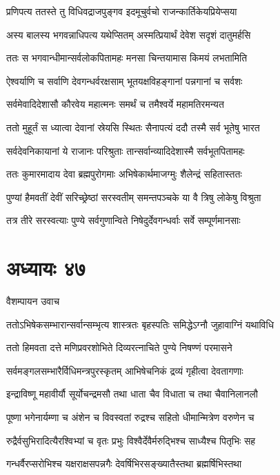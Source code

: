 \twolineshloka
{प्रणिपत्य ततस्ते तु विधिवद्राजपुङ्गव}
{इदमूचुर्वचो राजन्कार्तिकेयप्रियेप्सया}


\twolineshloka
{अस्य बालस्य भगवन्नाधिपत्य यथेप्सितम्}
{अस्मत्प्रियार्थं देवेश सदृशं दातुमर्हसि}


\twolineshloka
{ततः स भगवान्धीमान्सर्वलोकपितामहः}
{मनसा चिन्तयामास किमयं लभतामिति}


\twolineshloka
{ऐश्वर्याणि च सर्वाणि देवगन्धर्वरक्षसाम्}
{भूतयक्षविहङ्गानां पन्नगानां च सर्वशः}


\twolineshloka
{सर्वमेवादिदेशासौ कौरवेय महात्मनः}
{समर्थं च तमैश्वर्ये महामतिरमन्यत}


\twolineshloka
{ततो मुहूर्तं स ध्यात्वा देवानां स्रेयसि स्थितः}
{सैनापत्यं ददौ तस्मै सर्व भूतेषु भारत}


\twolineshloka
{सर्वदेवनिकायानां ये राजानः परिश्रुताः}
{तान्सर्वान्व्यादिदेशास्मै सर्वभूतपितामहः}


\twolineshloka
{ततः कुमारमादाय देवा ब्रह्मपुरोगमाः}
{अभिषेकार्थमाजग्मुः शैलेन्द्रं सहितास्ततः}


\twolineshloka
{पुण्यां हैमवतीं देवीं सरिच्छ्रेष्ठां सरस्वतीम्}
{समन्तपञ्चके या वै त्रिषु लोकेषु विश्रुता}


\twolineshloka
{तत्र तीरे सरस्वत्याः पुण्ये सर्वगुणान्विते}
{निषेदुर्देवगन्धर्वाः सर्वे सम्पूर्णमानसाः}


\chapter{अध्यायः ४७}
\twolineshloka
{वैशम्पायन उवाच}
{}


\twolineshloka
{ततोऽभिषेकसम्भारान्सर्वान्सम्भृत्य शास्त्रतः}
{बृहस्पतिः समिद्धेऽग्नौ जुहावाग्निं यथाविधि}


\twolineshloka
{ततो हिमवता दत्ते मणिप्रवरशोभिते}
{दिव्यरत्नाचिते पुण्ये निषण्णं परमासने}


\twolineshloka
{सर्वमङ्गलसम्भारैर्विधिमन्त्रपुरस्कृतम्}
{आभिषेचनिकं द्रव्यं गृहीत्वा देवतागणाः}


\twolineshloka
{इन्द्राविष्णू महावीर्यौ सूर्योचन्द्रमसौ तथा}
{धाता चैव विधाता च तथा चैवानिलानलौ}


\twolineshloka
{पूष्णा भगेनार्यम्णा च अंशेन च विवस्वतां}
{रुद्रश्च सहितो धीमान्मित्रेण वरुणेन च}


\twolineshloka
{रुद्रैर्वसुभिरादित्यैरश्विभ्यां च वृतः प्रभुः}
{विश्वैर्देवैर्मरुद्भिश्च साध्यैश्च पितृभिः सह}


\twolineshloka
{गन्धर्वैरप्सरोभिश्च यक्षराक्षसपन्नगैः}
{देवर्षिभिरसङ्ख्यातैस्तथा ब्रह्मर्षिभिस्तथा}


